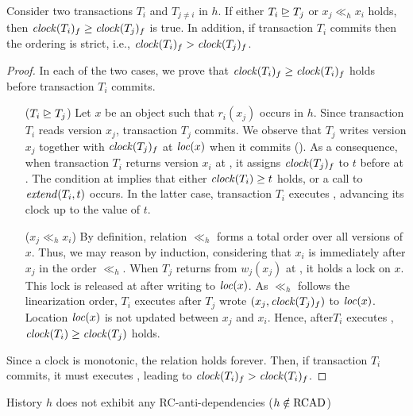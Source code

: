 \begin{proposition}
  Consider two transactions $T_i$ and $T_{j \neq i}$ in $h$.
  If either $T_i \mathrel{\unrhd} T_j$ or  $x_j \ll_h x_i$ holds, then $\clockOf{T_i}_f \geq \clockOf{T_j}_f$ is true.
  In addition, if transaction $T_i$ commits then the ordering is strict, i.e., $\clockOf{T_i}_f > \clockOf{T_j}_f$.
\end{proposition}

\begin{proof}

  In each of the two cases, we prove that $\clockOf{T_i}_f \geq \clockOf{T_i}_f$ holds before transaction $T_i$ commits.
  \begin{itemize}
  \item[($T_i \mathrel{\unrhd} T_j$)]
    Let $x$ be an object such that $r_i(x_j)$ occurs in $h$.
    Since transaction $T_i$ reads version $x_j$, transaction $T_j$ commits.
    We observe that $T_j$ writes version $x_j$ together with $\clockOf{T_j}_f$ at $\locationOf{x}$ when it commits ().
    As a consequence, when transaction $T_i$ returns version $x_i$ at , it assigns $\clockOf{T_j}_f$ to $t$ before at .
    The condition at  implies that either $\clockOf{T_i} \geq t$ holds, or a call to $\stmExtend{T_i,t}$ occurs.
    In the latter case, transaction $T_i$ executes , advancing its clock up to the value of $t$.
  \item[($x_j \ll_h x_i$)]
    By definition, relation $\ll_h$ forms a total order over all versions of $x$.
    Thus, we may reason by induction, considering that $x_i$ is immediately after $x_j$ in the order $\ll_h$.
    When $T_j$ returns from $w_j(x_j)$ at , it holds a lock on $x$.
    This lock is released at  after writing to $\locationOf{x}$.
    As $\ll_h$ follows the linearization order, $T_i$ executes  after $T_j$ wrote $(x_j, \clockOf{T_j}_f)$ to $\locationOf{x}$.
    Location $\locationOf{x}$ is not updated between $x_j$ and $x_i$.
    Hence, after$T_i$ executes , $\clockOf{T_i} \geq \clockOf{T_j}$ holds.
  \end{itemize}
  Since a clock is monotonic, the relation holds forever.
  Then, if transaction $T_i$ commits, it must executes , leading to $\clockOf{T_i}_f > \clockOf{T_i}_f$.
\end{proof}

\begin{proposition}
  History $h$ does not exhibit any RC-anti-dependencies ($h \notin \RCAD$)
\end{proposition}

